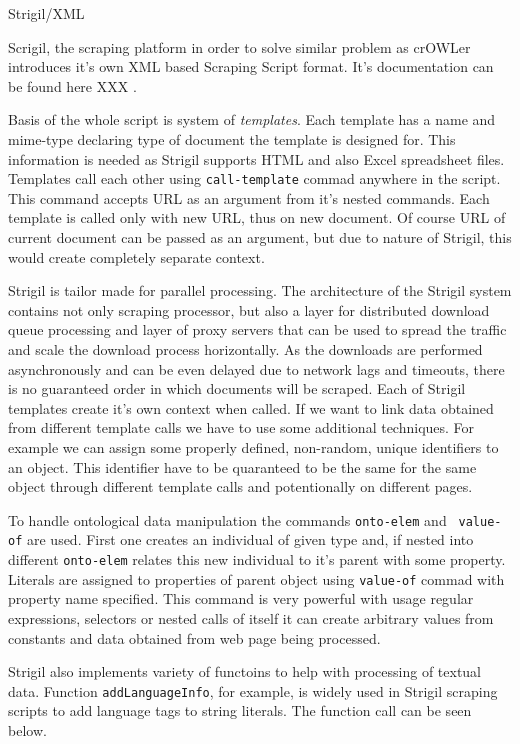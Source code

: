 \secc Strigil/XML

Scrigil, the scraping platform in order to solve similar problem as crOWLer
introduces it's own XML based Scraping Script format. It's documentation can be
found here XXX
. 

Basis of the whole script is system of {\em templates}. Each template has a name
and mime-type declaring type of document the template is designed for. This
information is needed as Strigil supports HTML and also Excel spreadsheet
files. Templates call each other using {\tt call-template} commad anywhere in
the script. This command accepts URL as an argument from it's nested commands.
Each template is called only with new URL, thus on new document. Of course URL
of current document can be passed as an argument, but due to nature of Strigil,
this would create completely separate context. 

Strigil is tailor made for parallel processing. The architecture of the Strigil
system contains not only scraping processor, but also a layer for distributed
download queue processing and layer of proxy servers that can be used to spread
the traffic and scale the download process horizontally. As the downloads are
performed asynchronously and can be even delayed due to network lags and
timeouts, there is no guaranteed order in which documents will be scraped.
Each of Strigil templates create it's own context when called. If we want to
link data obtained from different template calls we have to use some additional
techniques. For example we can assign some properly defined, non-random, unique
identifiers to an object. This identifier have to be quaranteed to be the same
for the same object through different template calls and potentionally on
different pages. 

To handle ontological data manipulation the commands {\tt onto-elem} and {\tt
value-of} are used. First one creates an individual of given type and, if
nested into different {\tt onto-elem} relates this new individual to it's
parent with some property. Literals are assigned to properties of parent object
using {\tt value-of} commad with property name specified. This command is very
powerful with usage regular expressions, selectors or nested calls of itself it
can create arbitrary values from constants and data obtained from web page
being processed. 

Strigil also implements variety of functoins to help with processing of textual
data. Function {\tt addLanguageInfo}, for example, is widely used in Strigil
scraping scripts to add language tags to string literals. The function call can
be seen below. 

